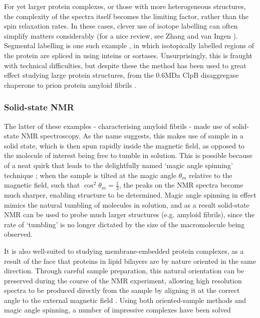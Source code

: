 \documentclass[a4paper,11pt,twoside,openright]{scrbook}
\begin{document}
For yet larger protein complexes, or those with more heterogeneous structures, the complexity of the spectra itself becomes the limiting factor, rather than the spin relaxation rates. In these cases, clever use of isotope labelling can often simplify matters considerably (for a nice review, see Zhang and van Ingen \cite{Zhang2016}). Segmental labelling is one such example \cite{Liu2009a}, in which isotopically labelled regions of the protein are spliced in using inteins or sortases. Unsurprisingly, this is fraught with technical difficulties, but despite these the method has been used to great effect studying large protein structures, from the 0.6MDa ClpB disaggregase chaperone \cite{Rosenzweig2015} to prion protein amyloid fibrils \cite{Frederick2017}.

\subsubsection{Solid-state NMR}
The latter of these examples - characterising amyloid fibrils - made use of solid-state NMR spectroscopy. As the name suggests, this makes use of sample in a solid state, which is then spun rapidly inside the magnetic field, as opposed to the molecule of interest being free to tumble in solution. This is possible because of a neat quirk that leads to the delightfully named `magic angle spinning' technique \cite{Andrew1958,Lowe1959}; when the sample is tilted at the magic angle $\theta_{m}$ relative to the magnetic field, such that $\cos^{2}\theta_{m} = \frac{1}{3}$, the peaks on the NMR spectra become much sharper, enabling structure to be determined. Magic angle spinning in effect mimics the natural tumbling of molecules in solution, and as a result solid-state NMR can be used to probe much larger structures (e.g. amyloid fibrils), since the rate of `tumbling' is no longer dictated by the size of the macromolecule being observed.

It is also well-suited to studying membrane-embedded protein complexes, as a result of the face that proteins in lipid bilayers are by nature oriented in the same direction. Through careful sample preparation, this natural orientation can be preserved during the course of the NMR experiment, allowing high resolution spectra to be produced directly from the sample by aligning it at the correct angle to the external magnetic field \cite{Hansen2015}. Using both oriented-sample methods and magic angle spinning, a number of impressive complexes have been solved \cite{Kaplan maybe?}
\end{document}
